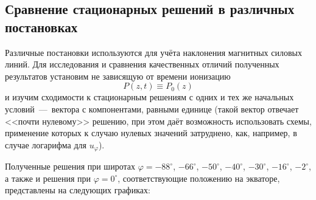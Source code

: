 \documentclass[14pt, a4paper, fleqn]{extarticle}
\begin{document}





\subsection{Сравнение стационарных решений в различных постановках}


Различные постановки используются для учёта наклонения магнитных силовых линий. Для исследования и сравнения качественных отличий полученных результатов установим не зависящую от времени ионизацию $$P(z, t) \equiv P_0(z)$$ и изучим сходимости к стационарным решениям с одних и тех же начальных условий~---~вектора с компонентами, равными единице (такой вектор отвечает <<почти нулевому>> решению, при этом даёт возможность использовать схемы, применение которых к случаю нулевых значений затруднено, как, например, в случае логарифма для $u_\varphi$). 

Полученные решения при широтах $\varphi = -88^\circ$, $-66^\circ$, $-50^\circ$, $-40^\circ$, $-30^\circ$, $-16^\circ$, $-2^\circ$, а также и решения при $\varphi = 0^\circ$, соответствующие положению на экваторе, представлены на следующих графиках:
\end{document}
